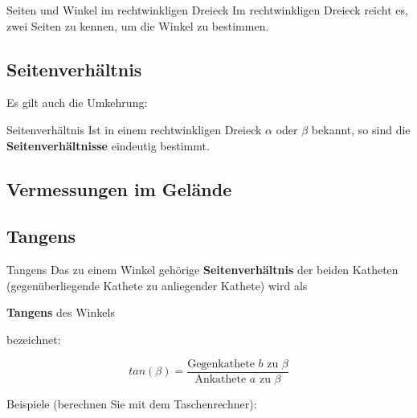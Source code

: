 \begin{gesetz}{Seiten und Winkel im rechtwinkligen Dreieck}{}
Im rechtwinkligen Dreieck reicht es, zwei Seiten zu kennen, um die
Winkel zu bestimmen.
\end{gesetz}


\subsection{Seitenverhältnis}
Es gilt auch die Umkehrung:
\begin{gesetz}{Seitenverhältnis}{}
Ist in einem rechtwinkligen Dreieck $\alpha$ oder $\beta$ bekannt, so
sind die \textbf{Seitenverhältnisse} eindeutig bestimmt.
\end{gesetz}
\newpage

\subsection{Vermessungen im Gelände}





\newpage
\subsection{Tangens}

\begin{definition}{Tangens}{}
Das zu einem Winkel gehörige \textbf{Seitenverhältnis} der beiden
Katheten (gegenüberliegende Kathete zu anliegender Kathete) wird als

\begin{center}\textbf{Tangens} des Winkels\end{center}
  bezeichnet:

    $$tan(\beta) = \frac{\text{Gegenkathete } b \text{ zu }
    \beta}{\text{Ankathete } a \text{ zu } \beta}$$
\end{definition}

Beispiele (berechnen Sie mit dem Taschenrechner):


